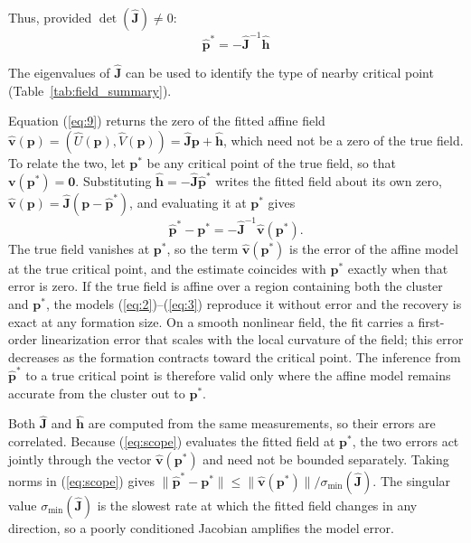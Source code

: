 \documentclass[lettersize,journal]{IEEEtran}
\begin{document}
Thus, provided $\det(\hat{\mathbf{J}}) \neq 0$:
\begin{equation}\label{eq:9}
\hat{\mathbf{p}}^* = -\hat{\mathbf{J}}^{-1}\hat{\mathbf{h}}
\end{equation}

The eigenvalues of $\hat{\mathbf{J}}$ can be used to identify the type of nearby critical point (Table~\ref{tab:field_summary}).

Equation (\ref{eq:9}) returns the zero of the fitted affine field $\hat{\mathbf{v}}(\mathbf{p}) = (\hat{U}(\mathbf{p}), \hat{V}(\mathbf{p})) = \hat{\mathbf{J}}\mathbf{p} + \hat{\mathbf{h}}$, which need not be a zero of the true field. To relate the two, let $\mathbf{p}^*$ be any critical point of the true field, so that $\mathbf{v}(\mathbf{p}^*) = \mathbf{0}$. Substituting $\hat{\mathbf{h}} = -\hat{\mathbf{J}}\hat{\mathbf{p}}^*$ writes the fitted field about its own zero, $\hat{\mathbf{v}}(\mathbf{p}) = \hat{\mathbf{J}}(\mathbf{p} - \hat{\mathbf{p}}^*)$, and evaluating it at $\mathbf{p}^*$ gives
\begin{equation}\label{eq:scope}
\hat{\mathbf{p}}^* - \mathbf{p}^* = -\hat{\mathbf{J}}^{-1}\hat{\mathbf{v}}(\mathbf{p}^*).
\end{equation}
The true field vanishes at $\mathbf{p}^*$, so the term $\hat{\mathbf{v}}(\mathbf{p}^*)$ is the error of the affine model at the true critical point, and the estimate coincides with $\mathbf{p}^*$ exactly when that error is zero. If the true field is affine over a region containing both the cluster and $\mathbf{p}^*$, the models (\ref{eq:2})--(\ref{eq:3}) reproduce it without error and the recovery is exact at any formation size. On a smooth nonlinear field, the fit carries a first-order linearization error that scales with the local curvature of the field; this error decreases as the formation contracts toward the critical point. The inference from $\hat{\mathbf{p}}^*$ to a true critical point is therefore valid only where the affine model remains accurate from the cluster out to $\mathbf{p}^*$.

Both $\hat{\mathbf{J}}$ and $\hat{\mathbf{h}}$ are computed from the same measurements, so their errors are correlated. Because (\ref{eq:scope}) evaluates the fitted field at $\mathbf{p}^*$, the two errors act jointly through the vector $\hat{\mathbf{v}}(\mathbf{p}^*)$ and need not be bounded separately. Taking norms in (\ref{eq:scope}) gives $\|\hat{\mathbf{p}}^* - \mathbf{p}^*\| \le \|\hat{\mathbf{v}}(\mathbf{p}^*)\|/\sigma_{\min}(\hat{\mathbf{J}})$. The singular value $\sigma_{\min}(\hat{\mathbf{J}})$ is the slowest rate at which the fitted field changes in any direction, so a poorly conditioned Jacobian amplifies the model error.
\end{document}
